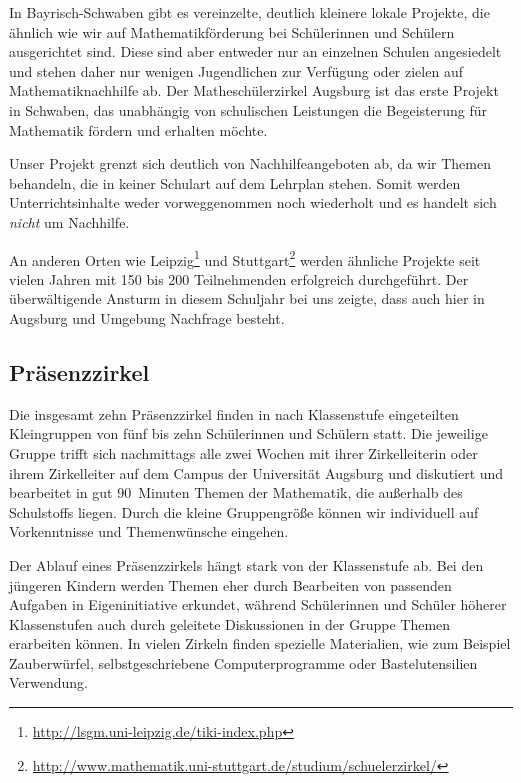 \documentclass[12pt]{zettel}
\begin{document}
In Bayrisch-Schwaben gibt es vereinzelte, deutlich kleinere lokale
Projekte, die ähnlich wie wir auf Mathematikförderung bei Schülerinnen und
Schülern ausgerichtet sind. Diese sind aber entweder nur an einzelnen Schulen
angesiedelt und stehen daher nur wenigen Jugendlichen zur Verfügung oder zielen
auf Mathematiknachhilfe ab. Der Matheschülerzirkel Augsburg ist das erste
Projekt in Schwaben, das unabhängig von schulischen Leistungen die
Begeisterung für Mathematik fördern und erhalten möchte.

Unser Projekt grenzt sich deutlich von Nachhilfeangeboten ab, da wir Themen behandeln, die in keiner Schulart auf dem Lehrplan stehen. Somit werden Unterrichtsinhalte weder vorweggenommen noch wiederholt und es handelt sich \emph{nicht} um Nachhilfe.

An anderen Orten wie Leipzig\footnote{\href{http://lsgm.uni-leipzig.de/tiki-index.php}{\textsf{http:/\!/lsgm.uni-leipzig.de/tiki-index.php}}} und Stuttgart\footnote{\href{http://www.mathematik.uni-stuttgart.de/studium/schuelerzirkel/}{\textsf{http:/\!/www.mathematik.uni-stuttgart.de/studium/schuelerzirkel/}}} werden ähnliche Projekte seit
vielen Jahren mit 150 bis 200 Teilnehmenden erfolgreich durchgeführt. Der überwältigende Ansturm in
diesem Schuljahr bei uns zeigte, dass auch hier in Augsburg und Umgebung Nachfrage
besteht.

\subsection{Präsenzzirkel}

Die insgesamt zehn Präsenzzirkel finden in nach Klassenstufe eingeteilten
Kleingruppen von fünf bis zehn Schülerinnen und Schülern statt.
Die jeweilige Gruppe trifft sich nachmittags alle zwei Wochen mit ihrer Zirkelleiterin oder ihrem
Zirkelleiter auf dem Campus der Universität Augsburg und diskutiert und
bearbeitet in gut 90~Minuten Themen der Mathematik, die außerhalb des
Schulstoffs liegen. Durch die kleine Gruppengröße können wir individuell auf
Vorkenntnisse und Themenwünsche eingehen.

Der Ablauf eines Präsenzzirkels hängt stark von der Klassenstufe ab. Bei den
jüngeren Kindern werden Themen eher durch Bearbeiten von passenden
Aufgaben in Eigeninitiative erkundet, während Schülerinnen und Schüler höherer
Klassenstufen auch durch geleitete Diskussionen in der Gruppe
Themen erarbeiten können. In vielen Zirkeln finden spezielle Materialien,
wie zum Beispiel Zauberwürfel, selbstgeschriebene Computerprogramme oder
Bastelutensilien Verwendung.
\end{document}
